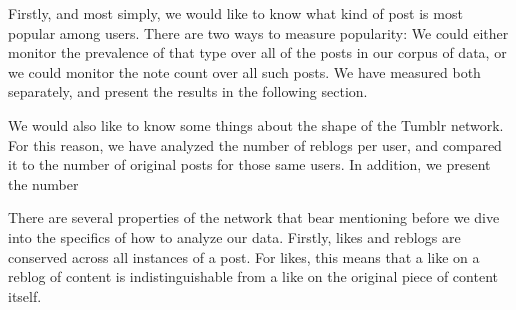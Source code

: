 Firstly, and most simply, we would like to know what kind of post is 
most popular among users.  There are two ways to measure popularity: We 
could either monitor the prevalence of that type over all of the posts 
in our corpus of data, or we could monitor the note count over all such 
posts.  We have measured both separately, and present the results in the 
following section.

We would also like to know some things about the shape of the Tumblr 
network.  For this reason, we have analyzed the number of reblogs per 
user, and compared it to the number of original posts for those same 
users.  In addition, we present the number





There are several properties of the network that bear mentioning before 
we dive into the specifics of how to analyze our data.  Firstly, likes 
and reblogs are conserved across all instances of a post.  For likes, 
this means that a like on a reblog of content is indistinguishable from 
a like on the original piece of content itself.
